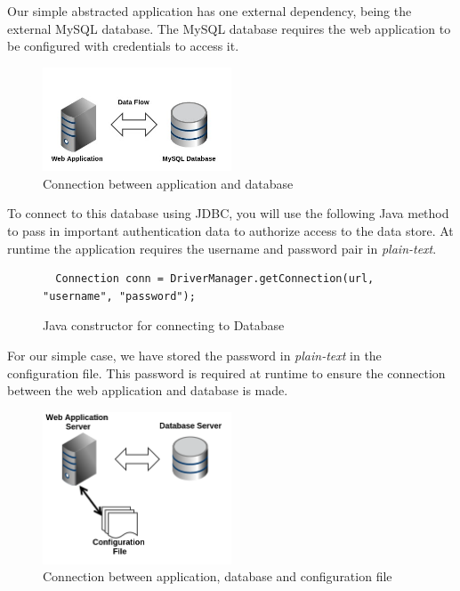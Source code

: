 \documentclass[11pt, a4paper, twoside, openany, notitlepage]{report}
\begin{document}
Our simple abstracted application has one external dependency, being the external MySQL database.  The MySQL database requires the web application to be configured with credentials to access it. 

\begin{figure}[!ht]
    \centering
    \includegraphics[width=0.5\textwidth]{external-overview.jpg}
    \caption{Connection between application and database}
\end{figure}

To connect to this database using JDBC, you will use the following Java method to pass in important authentication data to authorize access to the data store. At runtime the application requires the username and password pair in \emph{plain-text}. \\


\begin{figure}[!ht]
\begin{lstlisting}
  Connection conn = DriverManager.getConnection(url, "username", "password");
\end{lstlisting} 
\caption{Java constructor for connecting to Database}
\end{figure}

For our simple case, we have stored the password in \emph{plain-text} in the configuration file. This password is required at runtime to ensure the connection between the web application and database is made. \\

\begin{figure}[!ht]
    \centering
    \includegraphics[width=0.5\textwidth]{config}
    \caption{Connection between application, database and configuration file}
\end{figure}
\end{document}
